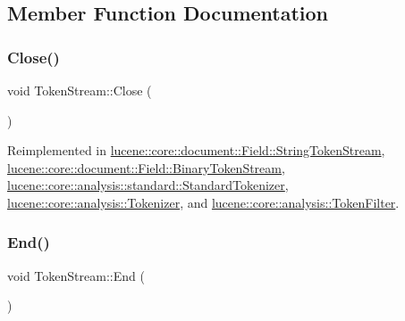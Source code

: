 \subsection{Member Function Documentation}
\mbox{\label{classlucene_1_1core_1_1analysis_1_1TokenStream_ad7963391ddbb2c75610e3738ba5155c8}} 
\subsubsection{\texorpdfstring{Close()}{Close()}}
{\footnotesize\ttfamily void Token\+Stream\+::\+Close (\begin{DoxyParamCaption}{ }\end{DoxyParamCaption})\hspace{0.3cm}{\ttfamily [virtual]}}



Reimplemented in \mbox{\hyperlink{classlucene_1_1core_1_1document_1_1Field_1_1StringTokenStream_a1852abe05943aaf330ef776fc783f472}{lucene\+::core\+::document\+::\+Field\+::\+String\+Token\+Stream}}, \mbox{\hyperlink{classlucene_1_1core_1_1document_1_1Field_1_1BinaryTokenStream_a40c73dd8eae9ab36e7e8f9e859a037ae}{lucene\+::core\+::document\+::\+Field\+::\+Binary\+Token\+Stream}}, \mbox{\hyperlink{classlucene_1_1core_1_1analysis_1_1standard_1_1StandardTokenizer_a108793659fb18bdd695e0c2be91ba730}{lucene\+::core\+::analysis\+::standard\+::\+Standard\+Tokenizer}}, \mbox{\hyperlink{classlucene_1_1core_1_1analysis_1_1Tokenizer_a95c3c0e37e3276be69fa0992b0e45e94}{lucene\+::core\+::analysis\+::\+Tokenizer}}, and \mbox{\hyperlink{classlucene_1_1core_1_1analysis_1_1TokenFilter_a4b991b01385423b87b5714061e4326c8}{lucene\+::core\+::analysis\+::\+Token\+Filter}}.

\mbox{\label{classlucene_1_1core_1_1analysis_1_1TokenStream_a4693985ca7fb242412049a074027b8b5}} 
\subsubsection{\texorpdfstring{End()}{End()}}
{\footnotesize\ttfamily void Token\+Stream\+::\+End (\begin{DoxyParamCaption}{ }\end{DoxyParamCaption})\hspace{0.3cm}{\ttfamily [virtual]}}



